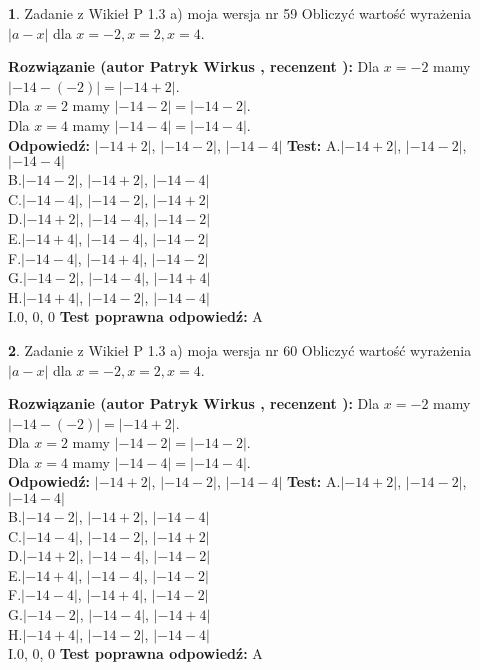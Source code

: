 \documentclass[12pt, a4paper]{article}
\theoremstyle{definition} %
\newtheorem{zad}{}
\newcommand{\zadStart}[1]{\begin{zad}#1\newline}
\newcommand{\zadStop}{\end{zad}}
\newcommand{\rozwStart}[2]{\noindent \textbf{Rozwiązanie (autor #1 , recenzent #2): }\newline}
\newcommand{\rozwStop}{\newline}
\newcommand{\odpStart}{\noindent \textbf{Odpowiedź:}\newline}
\newcommand{\odpStop}{\newline}
\newcommand{\testStart}{\noindent \textbf{Test:}\newline}
\newcommand{\testStop}{\newline}
\newcommand{\kluczStart}{\noindent \textbf{Test poprawna odpowiedź:}\newline}
\newcommand{\kluczStop}{\newline}
\begin{document}
\zadStart{Zadanie z Wikieł P 1.3 a) moja wersja nr 59}
Obliczyć wartość wyrażenia $|a - x|$ dla $x=-2,x=2,x=4$.
\zadStop
\rozwStart{Patryk Wirkus}{}
Dla $x = -2$ mamy $|-14 - (-2)| = |-14 + 2|$.\\
Dla $x = 2$ mamy $|-14 - 2| = |-14 - 2|$.\\
Dla $x = 4$ mamy $|-14 - 4| = |-14 - 4|$.\\
\rozwStop
\odpStart
$|-14 + 2|$, $|-14 - 2|$, $|-14 - 4|$
\odpStop
\testStart
A.$|-14 + 2|$, $|-14 - 2|$, $|-14 - 4|$\\
B.$|-14 - 2|$, $|-14 + 2|$, $|-14 - 4|$\\
C.$|-14 - 4|$, $|-14 - 2|$, $|-14 + 2|$\\
D.$|-14 + 2|$, $|-14 - 4|$, $|-14 - 2|$\\
E.$|-14 + 4|$, $|-14 - 4|$, $|-14 - 2|$\\
F.$|-14 - 4|$, $|-14 + 4|$, $|-14 - 2|$\\
G.$|-14 - 2|$, $|-14 - 4|$, $|-14 + 4|$\\
H.$|-14 + 4|$, $|-14 - 2|$, $|-14 - 4|$\\
I.$0$, $0$, $0$
\testStop
\kluczStart
A
\kluczStop



\zadStart{Zadanie z Wikieł P 1.3 a) moja wersja nr 60}
Obliczyć wartość wyrażenia $|a - x|$ dla $x=-2,x=2,x=4$.
\zadStop
\rozwStart{Patryk Wirkus}{}
Dla $x = -2$ mamy $|-14 - (-2)| = |-14 + 2|$.\\
Dla $x = 2$ mamy $|-14 - 2| = |-14 - 2|$.\\
Dla $x = 4$ mamy $|-14 - 4| = |-14 - 4|$.\\
\rozwStop
\odpStart
$|-14 + 2|$, $|-14 - 2|$, $|-14 - 4|$
\odpStop
\testStart
A.$|-14 + 2|$, $|-14 - 2|$, $|-14 - 4|$\\
B.$|-14 - 2|$, $|-14 + 2|$, $|-14 - 4|$\\
C.$|-14 - 4|$, $|-14 - 2|$, $|-14 + 2|$\\
D.$|-14 + 2|$, $|-14 - 4|$, $|-14 - 2|$\\
E.$|-14 + 4|$, $|-14 - 4|$, $|-14 - 2|$\\
F.$|-14 - 4|$, $|-14 + 4|$, $|-14 - 2|$\\
G.$|-14 - 2|$, $|-14 - 4|$, $|-14 + 4|$\\
H.$|-14 + 4|$, $|-14 - 2|$, $|-14 - 4|$\\
I.$0$, $0$, $0$
\testStop
\kluczStart
A
\kluczStop
\end{document}
